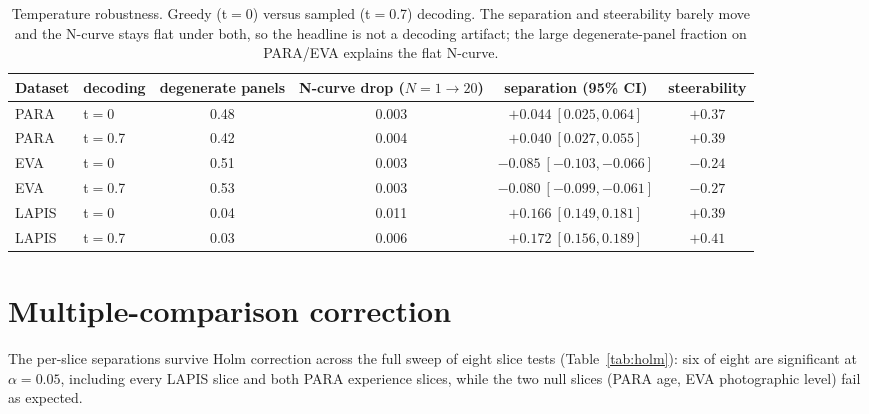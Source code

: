 \documentclass{article}
\begin{document}
\begin{table}[h]
  \caption{Temperature robustness. Greedy (t$=$0) versus sampled (t$=$0.7) decoding. The separation and steerability barely move and the N-curve stays flat under both, so the headline is not a decoding artifact; the large degenerate-panel fraction on PARA/EVA explains the flat N-curve.}
  \label{tab:temp}
  \centering
  \small
  \setlength{\tabcolsep}{3.5pt}
  \begin{tabular}{llcccc}
    \toprule
    Dataset & decoding & degenerate panels & N-curve drop ($N{=}1{\to}20$) & separation (95\% CI) & steerability \\
    \midrule
    PARA  & t$=$0    & 0.48 & 0.003 & $+0.044\ [0.025, 0.064]$ & $+0.37$ \\
    PARA  & t$=$0.7  & 0.42 & 0.004 & $+0.040\ [0.027, 0.055]$ & $+0.39$ \\
    EVA   & t$=$0    & 0.51 & 0.003 & $-0.085\ [-0.103, -0.066]$ & $-0.24$ \\
    EVA   & t$=$0.7  & 0.53 & 0.003 & $-0.080\ [-0.099, -0.061]$ & $-0.27$ \\
    LAPIS & t$=$0    & 0.04 & 0.011 & $+0.166\ [0.149, 0.181]$ & $+0.39$ \\
    LAPIS & t$=$0.7  & 0.03 & 0.006 & $+0.172\ [0.156, 0.189]$ & $+0.41$ \\
    \bottomrule
  \end{tabular}
\end{table}

\section{Multiple-comparison correction}
The per-slice separations survive Holm correction across the full sweep of eight slice tests (Table~\ref{tab:holm}): six of eight are significant at $\alpha=0.05$, including every LAPIS slice and both PARA experience slices, while the two null slices (PARA age, EVA photographic level) fail as expected.
\end{document}
